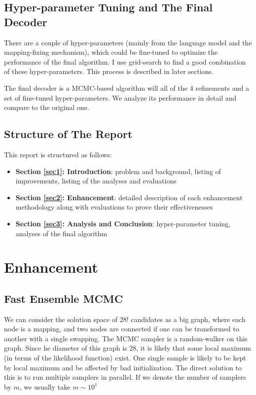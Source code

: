 \documentclass[10pt, twocolumn]{article}
\begin{document}
\subsection{Hyper-parameter Tuning and The Final Decoder}
There are a couple of hyper-parameters (mainly from the language model and the mapping-fixing mechanism), which could be fine-tuned to optimize the performance of the final algorithm. I use grid-search to find a good combination of these hyper-parameters. This process is described in later sections.

The final decoder is a MCMC-based algorithm will all of the 4 refinements and a set of fine-tuned hyper-parameters. We analyze its performance in detail and compare to the original one.

\subsection{Structure of The Report}
This report is structured as follows:
\begin{itemize}
	\item \textbf{Section \ref{sec1}: Introduction}: problem and background, listing of improvements, listing of the analyses and evaluations
	\item \textbf{Section \ref{sec2}: Enhancement}: detailed description of each enhancement methodology along with evaluations to prove their effectivenesses
	\item \textbf{Section \ref{sec3}: Analysis and Conclusion}: hyper-parameter tuning, analyses of the final algorithm
\end{itemize}


\section{\label{sec2} Enhancement}
\subsection{\label{subsec2.1}Fast Ensemble MCMC}
We can consider the solution space of $28!$ candidates as a big graph, where each node is a mapping, and two nodes are connected if one can be transformed to another with a single swapping. The MCMC sampler is a random-walker on this graph. Since he diameter of this graph is $28$, it is likely that some local maximum (in terms of the likelihood function) exist. One single sample is likely to be kept by local maximum and be affected by bad initialization. The direct solution to this is to run multiple samplers in parallel. If we denote the number of samplers by $m$, we usually take $m\sim10^1$
\end{document}
